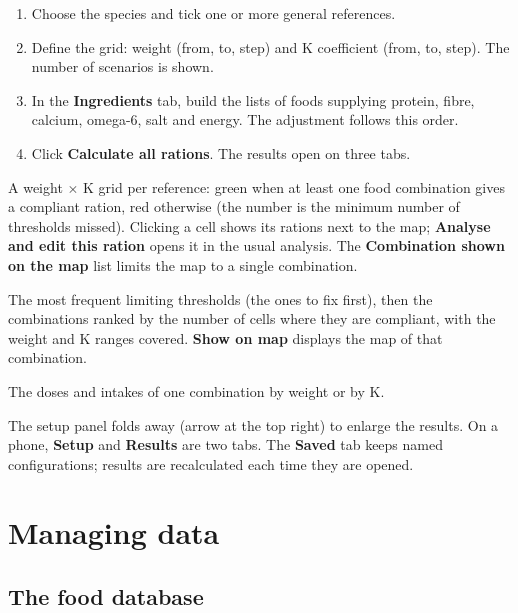 \documentclass[11pt,a4paper]{article}
\newcommand{\ui}[1]{\textsf{\textbf{#1}}}
\begin{document}
\begin{enumerate}
  \item Choose the species and tick one or more general references.
  \item Define the grid: weight (from, to, step) and K coefficient (from, to, step). The number
        of scenarios is shown.
  \item In the \ui{Ingredients} tab, build the lists of foods supplying protein, fibre,
        calcium, omega-6, salt and energy. The adjustment follows this order.
  \item Click \ui{Calculate all rations}. The results open on three tabs.
\end{enumerate}

\begin{description}[style=nextline,leftmargin=0pt,itemsep=4pt]
  \item[\ui{Map}] A weight $\times$ K grid per reference: green when at least one food
        combination gives a compliant ration, red otherwise (the number is the minimum number of
        thresholds missed). Clicking a cell shows its rations next to the map;
        \ui{Analyse and edit this ration} opens it in the usual analysis. The
        \ui{Combination shown on the map} list limits the map to a single combination.
  \item[\ui{Combinations}] The most frequent limiting thresholds (the ones to fix first), then
        the combinations ranked by the number of cells where they are compliant, with the weight
        and K ranges covered. \ui{Show on map} displays the map of that combination.
  \item[\ui{Curves}] The doses and intakes of one combination by weight or by K.
\end{description}

The setup panel folds away (arrow at the top right) to enlarge the results. On a phone,
\ui{Setup} and \ui{Results} are two tabs. The \ui{Saved} tab keeps named configurations; results
are recalculated each time they are opened.

\section{Managing data}

\subsection{The food database}
\label{sec:aliments}
\end{document}
